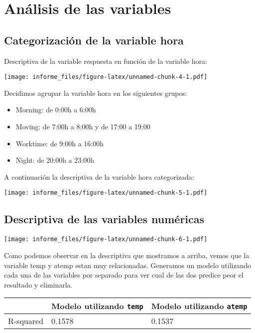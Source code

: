 \documentclass[
]{article}
\providecommand{\tightlist}{%
  \setlength{\itemsep}{0pt}\setlength{\parskip}{0pt}}
\begin{document}
\hypertarget{anuxe1lisis-de-las-variables}{%
\section{Análisis de las variables}\label{anuxe1lisis-de-las-variables}}

\hypertarget{categorizaciuxf3n-de-la-variable-hora}{%
\subsection{Categorización de la variable
hora}\label{categorizaciuxf3n-de-la-variable-hora}}

Descriptiva de la variable respuesta en función de la variable hora:

\texttt{[image: informe\_files/figure-latex/unnamed-chunk-4-1.pdf]}

Decidimos agrupar la variable hora en los siguientes grupos:

\begin{itemize}
\tightlist
\item
  Morning: de 0:00h a 6:00h
\item
  Moving: de 7:00h a 8:00h y de 17:00 a 19:00
\item
  Worktime: de 9:00h a 16:00h
\item
  Night: de 20:00h a 23:00h
\end{itemize}

A continuación la descriptiva de la variable hora categorizada:

\texttt{[image: informe\_files/figure-latex/unnamed-chunk-5-1.pdf]}

\hypertarget{descriptiva-de-las-variables-numuxe9ricas}{%
\subsection{Descriptiva de las variables
numéricas}\label{descriptiva-de-las-variables-numuxe9ricas}}

\texttt{[image: informe\_files/figure-latex/unnamed-chunk-6-1.pdf]}

Como podemos observar en la descriptiva que mostramos a arriba, vemos
que la variable temp y atemp estan muy relacionadas. Generamos un modelo
utilizando cada una de las variables por separado para ver cual de las
dos predice peor el resultado y eliminarla.

\begin{longtable}[]{@{}lll@{}}
\toprule
& Modelo utilizando \texttt{temp} & Modelo utilizando
\texttt{atemp}\tabularnewline
\midrule
\endhead
R-squared & 0.1578 & 0.1537\tabularnewline
\bottomrule
\end{longtable}
\end{document}
